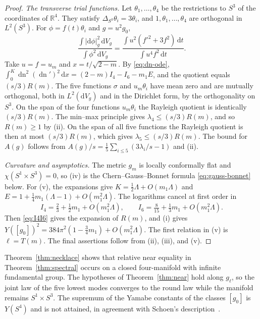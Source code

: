 \documentclass[11pt]{article}
\numberwithin{equation}{section}
\DeclareMathOperator{\dn}{dn}
\newcommand{\dd}{\mathrm{d}}
\newcommand{\RR}{\mathbb{R}}
\newcommand{\Sphere}{S^4}
\newcommand{\abs}[1]{\lvert #1\rvert}
\newcommand{\dv}{\dd V_g}
\begin{document}
\begin{proof}
\emph{The transverse trial functions.}
Let \(\theta_1,\ldots,\theta_4\) be the restrictions to \(S^3\) of the
coordinates of \(\RR^4\). They satisfy
\(\Delta_{S^3}\theta_i=3\theta_i\), and \(1,\theta_1,\ldots,\theta_4\)
are orthogonal in \(L^2(S^3)\). For \(\phi=f(t)\theta_i\) and
\(g=u^2g_0\),
\[
 \frac{\int\abs{\dd\phi}_g^2\,\dv}{\int\phi^2\,\dv}
 =\frac{\int u^2(f'^2+3f^2)\,\dd t}{\int u^4f^2\,\dd t}.
\]
Take \(u=f=u_m\) and \(x=t/\sqrt{2-m}\). By \eqref{eq:dn-ode},
\(\int_0^K\dn^2(\dn')^2\,\dd x=(2-m)I_4-I_6-m_1E\), and the quotient
equals \((s/3)R(m)\). The five functions \(\sigma\) and
\(u_m\theta_i\) have mean zero and are mutually orthogonal, both in
\(L^2(\dv)\) and in the Dirichlet form, by the orthogonality on
\(S^3\). On the span of the four functions \(u_m\theta_i\) the Rayleigh
quotient is identically \((s/3)R(m)\). The min--max principle gives
\(\lambda_4\le(s/3)R(m)\), and so \(R(m)\ge1\) by (ii). On the span of
all five functions the Rayleigh quotient is then at most
\((s/3)R(m)\), which gives \(\lambda_5\le(s/3)R(m)\). The bound for
\(A(g)\) follows from
\(A(g)/s=\tfrac15\sum_{i\le5}(3\lambda_i/s-1)\) and (ii).

\emph{Curvature and asymptotics.}
The metric \(g_m\) is locally conformally flat and
\(\chi(S^1\times S^3)=0\), so (iv) is the Chern--Gauss--Bonnet formula
\eqref{eq:gauss-bonnet} below. For (v), the expansions
\cite[(19.12.1), (19.12.2)]{DLMF} give
\(K=\tfrac12\Lambda+O(m_1\Lambda)\) and
\(E=1+\tfrac14m_1(\Lambda-1)+O(m_1^2\Lambda)\). The logarithms cancel
at first order in
\[
 I_4=\tfrac23+\tfrac12m_1+O(m_1^2\Lambda),\qquad
 I_6=\tfrac8{15}+\tfrac13m_1+O(m_1^2\Lambda).
\]
Then \eqref{eq:I4I6} gives the expansion of \(R(m)\), and (i) gives
\(Y([g_0])^2=384\pi^2(1-\tfrac34m_1)+O(m_1^2\Lambda)\). The first
relation in (v) is \(\ell=T(m)\). The final assertions follow from
(ii), (iii), and (v).
\end{proof}

Theorem~\ref{thm:necklace} shows that relative near equality in
Theorem~\ref{thm:spectral} occurs on a closed four-manifold with
infinite fundamental group. The hypotheses of Theorem~\ref{thm:near}
hold along \(g_\ell\), so the joint law of the five lowest modes
converges to the round law while the manifold remains
\(S^1\times S^3\). The supremum of the Yamabe constants of the classes
\([g_0]\) is \(Y(\Sphere)\) and is not attained, in agreement with
Schoen's description~\cite[\S2]{Schoen1989Variational}.
\end{document}
